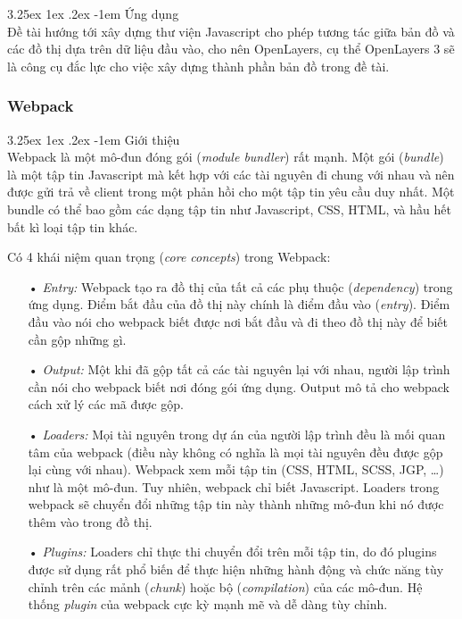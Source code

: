 \documentclass[12pt,a4paper,twoside]{article}
\makeatletter
\newcommand{\myparagraph}[1]{\paragraph{#1}\mbox{}\\} %
\renewcommand\paragraph{\@startsection{paragraph}{5}{\z@}%
  {3.25ex \@plus1ex \@minus.2ex}%
  {-1em}%
  {\normalfont\normalsize\bfseries}}
\makeatother
\begin{document}
\myparagraph{Ứng dụng}
Đề tài hướng tới xây dựng thư viện Javascript cho phép tương tác giữa bản đồ và các đồ thị dựa trên dữ liệu đầu vào, cho nên OpenLayers, cụ thể OpenLayers 3 sẽ là công cụ đắc lực cho việc xây dựng thành phần bản đồ trong đề tài.

\subsubsection{Webpack}
\myparagraph{Giới thiệu}
Webpack là một mô-đun đóng gói (\textit{module bundler}) rất mạnh. Một gói (\textit{bundle}) là một tập tin Javascript mà kết hợp với các tài nguyên đi chung với nhau và nên được gửi trả về client trong một phản hồi cho một tập tin yêu cầu duy nhất. Một bundle có thể bao gồm các dạng tập tin như Javascript, CSS, HTML, và hầu hết bất kì loại tập tin khác.

Có 4 khái niệm quan trọng (\textit{core concepts}) trong Webpack:

\begin{itemize}
\item[•] \emph{Entry:} Webpack tạo ra đồ thị của tất cả các phụ thuộc (\textit{dependency}) trong ứng dụng. Điểm bắt đầu của đồ thị này chính là điểm đầu vào (\textit{entry}). Điểm đầu vào nói cho webpack biết được nơi bắt đầu và đi theo đồ thị này để biết cần gộp những gì.
\item[•] \emph{Output:} Một khi đã gộp tất cả các tài nguyên lại với nhau, người lập trình cần nói cho webpack biết nơi đóng gói ứng dụng. Output mô tả cho webpack cách xử lý các mã được gộp.
\item[•] \emph{Loaders:} Mọi tài nguyên trong dự án của người lập trình đều là mối quan tâm của webpack (điều này không có nghĩa là mọi tài nguyên đều được gộp lại cùng với nhau). Webpack xem mỗi tập tin (CSS, HTML, SCSS, JGP, …) như là một mô-đun. Tuy nhiên, webpack chỉ biết Javascript. Loaders trong webpack sẽ chuyển đổi những tập tin này thành những mô-đun khi nó được thêm vào trong đồ thị.
\item[•] \emph{Plugins:} Loaders chỉ thực thi chuyển đổi trên mỗi tập tin, do đó plugins được sử dụng rất phổ biến để thực hiện những hành động và chức năng tùy chỉnh trên các mảnh (\textit{chunk}) hoặc bộ (\textit{compilation}) của các mô-đun. Hệ thống \textit{plugin} của webpack cực kỳ mạnh mẽ và dễ dàng tùy chỉnh.
\end{itemize}
\end{document}
